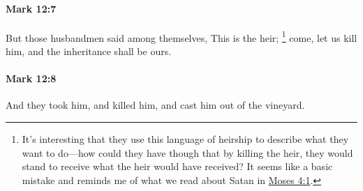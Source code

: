 		\paragraph{Mark 12:7} %
			\label{MARK-12-7}

			But those husbandmen said among themselves, This is the heir;%
				\footnote{%
					It's interesting that they use this language of heirship to describe what they want to do---how could they have though that by killing the heir, they would stand to receive what the heir would have received? It seems like a basic mistake and reminds me of what we read about Satan in \hyperref[MOSES-4-1]{Moses 4:1}.
					}
			come, let us kill him, and the inheritance shall be ours.

			\begin{framed}
			\scriptsize
				\begin{compactdesc}
					\item[SBLG] 
				\end{compactdesc}
			\end{framed}

		\paragraph{Mark 12:8} %
			\label{MARK-12-8}

			And they took him, and killed him, and cast him out of the vineyard.

